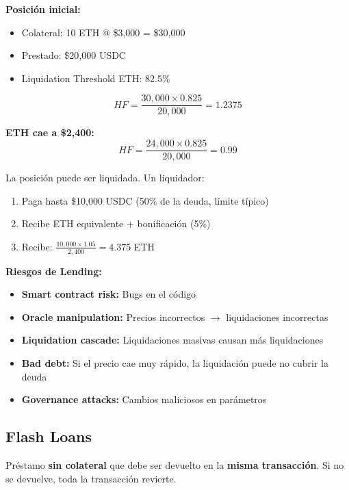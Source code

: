 \documentclass[11pt,a4paper,twoside]{book}
\begin{document}
\begin{example}
\textbf{Posici\'on inicial:}
\begin{itemize}
    \item Colateral: 10 ETH @ \$3,000 = \$30,000
    \item Prestado: \$20,000 USDC
    \item Liquidation Threshold ETH: 82.5\%
\end{itemize}

\[
HF = \frac{30,000 \times 0.825}{20,000} = 1.2375
\]

\textbf{ETH cae a \$2,400:}
\[
HF = \frac{24,000 \times 0.825}{20,000} = 0.99
\]

La posici\'on puede ser liquidada. Un liquidador:
\begin{enumerate}
    \item Paga hasta \$10,000 USDC (50\% de la deuda, l\'imite t\'ipico)
    \item Recibe ETH equivalente + bonificaci\'on (5\%)
    \item Recibe: $\frac{10,000 \times 1.05}{2,400} = 4.375$ ETH
\end{enumerate}
\end{example}

\begin{remark}
\textbf{Riesgos de Lending:}
\begin{itemize}
    \item \textbf{Smart contract risk:} Bugs en el c\'odigo
    \item \textbf{Oracle manipulation:} Precios incorrectos $\to$ liquidaciones incorrectas
    \item \textbf{Liquidation cascade:} Liquidaciones masivas causan m\'as liquidaciones
    \item \textbf{Bad debt:} Si el precio cae muy r\'apido, la liquidaci\'on puede no cubrir la deuda
    \item \textbf{Governance attacks:} Cambios maliciosos en par\'ametros
\end{itemize}
\end{remark}

\subsection{Flash Loans}

\begin{definition}
Pr\'estamo \textbf{sin colateral} que debe ser devuelto en la \textbf{misma transacci\'on}. Si no se devuelve, toda la transacci\'on revierte.
\end{definition}
\end{document}
